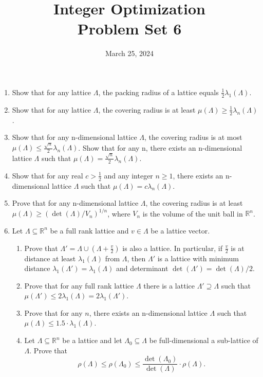 \documentclass[11pt,a4paper]{article}
\title{Integer Optimization  \\ Problem Set 6 }
\date{ March 25, 2024}
\begin{document}
\maketitle 


\begin{enumerate}
\item Show that for any lattice $Λ$, the packing radius of a lattice equals $\frac{1}{2}λ_1(Λ)$.

\item Show that for any lattice $Λ$, the covering radius is at least $μ(Λ) ≥ \frac{1}{2} λ_n (Λ)$.

\item Show that for any n-dimensional lattice $Λ$, the covering radius is at most $
μ(Λ) ≤ \frac{\sqrt{n}}{2} λ_n(Λ)$. Show that for any n, there exists an n-dimensional lattice $Λ$ such that $μ(Λ) =\frac{\sqrt{n}}{2} λ_n(Λ)$.

\item Show that for any real $c > \frac{1}{2}$ and any integer $n ≥ 1$, there exists an n- dimensional lattice $Λ$ such that $μ(Λ) = cλ_n(Λ)$.

\item Prove that for any n-dimensional lattice $Λ$, the covering radius is at least $μ(Λ) ≥ (\det(Λ)/V_n)^{1/n}$, where $V_n$ is the volume of the unit ball in $\mathbb{R}^n$.

\item Let $Λ ⊆ \mathbb{R}^n$ be a full rank lattice and $v ∈ Λ$ be a lattice vector. \begin{enumerate}
\item Prove that $Λ' = Λ ∪ (Λ + \frac{v}{2} )$ is also a lattice. In particular, if $\frac{v}{2}$ is at distance at least $λ_1 (Λ)$ from $Λ$, then $Λ'$ is a lattice with minimum distance $λ_1(Λ') = λ_1(Λ)$ and determinant $\det(Λ') = \det(Λ)/2$. 
\item Prove that for any full rank lattice $Λ$ there is a lattice $Λ' ⊇ Λ$ such that $μ(Λ') ≤ 2λ_1(Λ) = 2λ_1(Λ')$.
\item Prove that for any $n$, there exists an n-dimensional lattice $Λ$ such that $μ(Λ) ≤ 1.5 \cdot λ_1(Λ)$.
\item Let $Λ ⊆ ℝ^n$ be a lattice and let $Λ_0⊆Λ$  be  full-dimensional a sub-lattice of $Λ$. Prove that
  \begin{displaymath}
    ρ(Λ) ≤ ρ(Λ_0) ≤ \frac{\det(Λ_0)}{ \det(Λ)} ⋅ ρ(Λ). 
  \end{displaymath}
\end{enumerate}



\end{enumerate}


%
%


 
\end{document}
